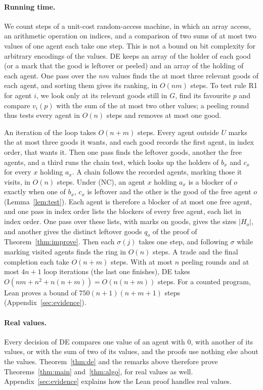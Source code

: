 \documentclass[runningheads,11pt]{llncs}
\newcommand{\DE}{\textup{DE}}
\begin{document}
\paragraph{Running time.} We count steps of a unit-cost random-access machine, in which an array access, an arithmetic operation on indices, and a comparison of two sums of at most two values of one agent each take one step. This is not a bound on bit complexity for arbitrary encodings of the values. \DE{} keeps an array of the holder of each good (or a mark that the good is leftover or peeled) and an array of the holding of each agent.
One pass over the $nm$ values finds the at most three relevant goods of each agent, and sorting them gives its ranking, in $O(nm)$ steps. To test rule R1 for agent $i$, we look only at its relevant goods still in $G$, find its favourite $p$ and compare $v_i(p)$ with the sum of the at most two other values; a peeling round thus tests every agent in $O(n)$ steps and removes at most one good.

An iteration of the loop takes $O(n+m)$ steps. Every agent outside $U$ marks the at most three goods it wants, and each good records the first agent, in index order, that wants it. Then one pass finds the leftover goods, another the free agents, and a third runs the chain test, which looks up the holders of $b_x$ and $c_x$ for every $x$ holding $a_x$. A chain follows the recorded agents, marking those it visits, in $O(n)$ steps. Under (NC), an agent $x$ holding $a_x$ is a blocker of $o$ exactly when one of $b_x$, $c_x$ is leftover and the other is the good of the free agent $o$ (Lemma~\ref{lem:test}). Each agent is therefore a blocker of at most one free agent, and one pass in index order lists the blockers of every free agent, each list in index order. One pass over these lists, with marks on goods, gives the sizes $|H_o|$, and another gives the distinct leftover goods $q_o$ of the proof of Theorem~\ref{thm:improve}. Then each $\sigma(j)$ takes one step, and following $\sigma$ while marking visited agents finds the ring in $O(n)$ steps. A trade and the final completion each take $O(n+m)$ steps. With at most $n$ peeling rounds and at most $4n+1$ loop iterations (the last one finishes), \DE{} takes $O(nm+n^2+n(n+m))=O(n(n+m))$ steps. For a counted program, Lean proves a bound of $750(n+1)(n+m+1)$ steps (Appendix~\ref{sec:evidence}).

\paragraph{Real values.} Every decision of \DE{} compares one value of an agent with $0$, with another of its values, or with the sum of two of its values, and the proofs use nothing else about the values. Theorem~\ref{thm:de} and the remarks above therefore prove Theorems~\ref{thm:main} and~\ref{thm:algo}, for real values as well. Appendix~\ref{sec:evidence} explains how the Lean proof handles real values.
\end{document}
